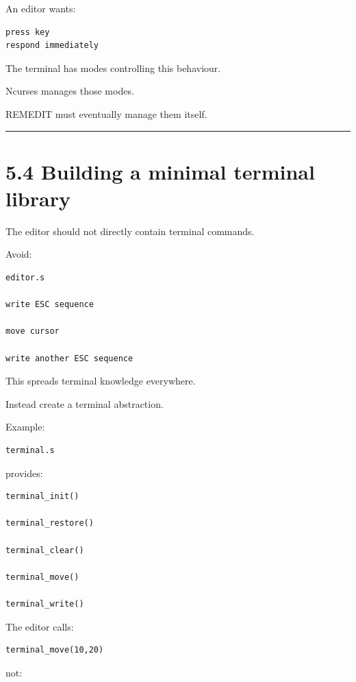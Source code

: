 \documentclass[
  oneside,
  openany]{book}
\begin{document}
An editor wants:

\begin{verbatim}
press key
respond immediately
\end{verbatim}

The terminal has modes controlling this behaviour.

Ncurses manages those modes.

REMEDIT must eventually manage them itself.

\begin{center}\rule{0.5\linewidth}{0.5pt}\end{center}

\hypertarget{building-a-minimal-terminal-library}{%
\section{5.4 Building a minimal terminal
library}\label{building-a-minimal-terminal-library}}

The editor should not directly contain terminal commands.

Avoid:

\begin{verbatim}
editor.s

write ESC sequence

move cursor

write another ESC sequence
\end{verbatim}

This spreads terminal knowledge everywhere.

Instead create a terminal abstraction.

Example:

\begin{verbatim}
terminal.s
\end{verbatim}

provides:

\begin{verbatim}
terminal_init()

terminal_restore()

terminal_clear()

terminal_move()

terminal_write()
\end{verbatim}

The editor calls:

\begin{verbatim}
terminal_move(10,20)
\end{verbatim}

not:
\end{document}
